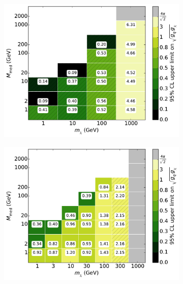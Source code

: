 \begin{figure}[h]
\begin{subfigure}[t]{0.325\textwidth}
      \includegraphics[width=1.\textwidth]{figures/grid_basepoints_SVD_rat2_monojet.pdf}
      \caption{}
    \end{subfigure}
    \begin{subfigure}[t]{0.325\textwidth}
      \centering
      \includegraphics[width=1.\textwidth]{figures/grid_allpoints_SVD_rat2.pdf}
      \caption{}
    \end{subfigure}
    \begin{subfigure}[t]{0.325\textwidth}
      \centering

\end{subfigure}
\end{figure}
